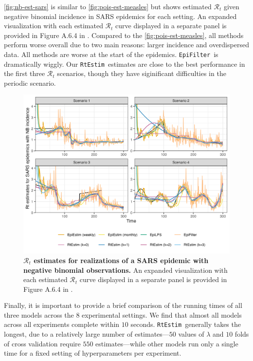 \documentclass[10pt,letterpaper]{article}
\def\RtEstim{\texttt{RtEstim}}
\def\EpiFilter{\texttt{EpiFilter}}
\def\calR{\mathcal{R}}
\begin{document}
\autoref{fig:nb-est-sars} is similar to \autoref{fig:pois-est-measles} but
shows estimated $\calR_t$ given negative binomial incidence in SARS epidemics
for each setting. An expanded visualization with each estimated $\calR_t$ curve
displayed in a separate panel is provided in Figure A.6.4 in .
Compared to the \autoref{fig:pois-est-measles}, all methods perform worse
overall due to two main reasons: larger incidence and overdispersed data. All
methods are worse at the start of the epidemics. \EpiFilter\ is dramatically
wiggly. Our \RtEstim\ estimates are close to the best
performance in the first three $\calR_t$ scenarios, though they have
siginificant difficulties in the periodic scenario. 

\begin{figure}[!t]
  \centering
  \includegraphics[width=1.0\linewidth]{fig/Fig6.png}
  \caption{
    {\bf $\calR_t$ estimates for realizations of a SARS epidemic with
    negative binomial observations.} An expanded visualization with each estimated
    $\calR_t$ curve displayed in a separate panel is provided in Figure A.6.4 in
    .}
  \label{fig:nb-est-sars}
\end{figure}

Finally, it is important to provide a brief comparison of the running times of
all three models across the $8$ experimental settings. We find that almost all
models across all experiments complete within $10$ seconds. \RtEstim\ generally
takes the longest, due to a relatively large number of estimates---$50$ values
of $\lambda$ and $10$ folds of cross validation require $550$ estimates---while
other models run only a single time for a fixed setting of hyperparameters per
experiment. 
\end{document}
